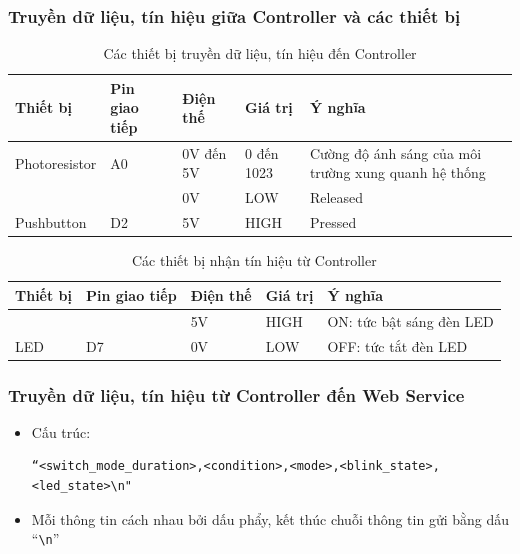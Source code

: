 \subsubsection{Truyền dữ liệu, tín hiệu giữa Controller và các thiết bị}
\begin{table}[H]
\centering
\small
\begin{tabular}{|p{2.5cm}|p{2.5cm}|p{2.5cm}|p{2.5cm}|p{4.5cm}|}
\hline
{\textbf{Thiết bị}}            & {\textbf{Pin giao tiếp}} & {\textbf{Điện thế}} & {\textbf{Giá trị}} & {\textbf{Ý nghĩa}}                                 \\ \hline
{Photoresistor}                & {A0}                     & {0V đến 5V}         & {0 đến 1023}       & {Cường độ ánh sáng của môi trường xung quanh hệ thống} \\ \hline
{}                             & {}                       & {0V}                & {LOW}              & {Released}                                         \\ \cline{3-5} 
\multirow{-2}{*}{{Pushbutton}} & \multirow{-2}{*}{{D2}}   & {5V}                & {HIGH}             & {Pressed}                                          \\ \hline

\end{tabular}
\caption{Các thiết bị truyền dữ liệu, tín hiệu đến Controller}
\label{tab:my_label}
\end{table}

\begin{table}[H]
\centering
\small
\begin{tabular}{|p{2.5cm}|p{2.5cm}|p{2.5cm}|p{2.5cm}|p{4.5cm}|}
\hline
{\textbf{Thiết bị}}     & {\textbf{Pin giao tiếp}} & {\textbf{Điện thế}} & {\textbf{Giá trị}} & {\textbf{Ý nghĩa}}         \\ \hline
{}                      & {}                       & {5V}                & {HIGH}             & {ON: tức bật sáng đèn LED} \\ \cline{3-5} 
\multirow{-2}{*}{{LED}} & \multirow{-2}{*}{{D7}}   & {0V}                & {LOW}              & {OFF: tức tắt đèn LED}     \\ \hline
\end{tabular}
\caption{Các thiết bị nhận tín hiệu từ Controller}
\label{tab:my_label}
\end{table}

\pagebreak
\subsubsection{Truyền dữ liệu, tín hiệu từ Controller đến Web Service}
\begin{itemize}
    \item Cấu trúc:
    \begin{lstlisting}
“<switch_mode_duration>,<condition>,<mode>,<blink_state>,<led_state>\n"\end{lstlisting}
    \item Mỗi thông tin cách nhau bởi dấu phẩy, kết thúc chuỗi thông tin gửi bằng dấu “\verb|\n|”
\end{itemize}

